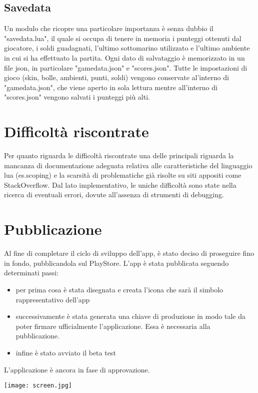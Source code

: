 \documentclass[12pt]{article}
\begin{document}
\subsection{Savedata}
Un modulo che ricopre una particolare importanza è senza dubbio il "savedata.lua", il quale si occupa di tenere in memoria i punteggi ottenuti dal giocatore, i soldi guadagnati, l'ultimo sottomarino utilizzato e l'ultimo ambiente in cui si ha effettuato la partita. Ogni dato di salvataggio è memorizzato in un file json, in particolare "gamedata.json" e "scores.json". 
Tutte le impostazioni di gioco  (skin, bolle, ambienti, punti, soldi) vengono conservate al'interno di "gamedata.json", che viene aperto in sola lettura mentre all'interno di "scores.json" vengono salvati i punteggi più alti. 

\section{Difficoltà riscontrate}
Per quanto riguarda le difficoltà riscontrate una delle principali riguarda la mancanza di documentazione adeguata relativa alle caratteristiche del linguaggio lua (es.scoping) e la scarsità di problematiche già risolte su siti appositi come StackOverflow. 
Dal lato implementativo, le uniche difficoltà sono state nella ricerca di eventuali errori, dovute all'assenza di strumenti di debugging.

\section{Pubblicazione}
Al fine di completare il ciclo di sviluppo dell'app, è stato deciso di proseguire fino in fondo, pubblicandola sul PlayStore.
L'app è stata pubblicata seguendo determinati passi:
\begin{itemize}
    \item per prima cosa è stata disegnata e creata l'icona che sarà il simbolo rappresentativo dell'app
    \item successivamente è stata generata una chiave di produzione in modo tale da poter firmare ufficialmente l'applicazione. Essa è necessaria alla pubblicazione.
    \item infine è stato avviato il beta test
\end{itemize}

L'applicazione è ancora in fase di approvazione.

\texttt{[image: screen.jpg]}
\end{document}
